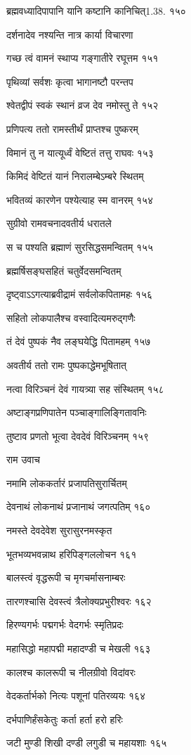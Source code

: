 ब्रह्मवध्यादिपापानि यानि कष्टानि कानिचित्1.38. १५०

दर्शनादेव नश्यन्ति नात्र कार्या विचारणा

गच्छ त्वं वामनं स्थाप्य गङ्गातीरे रघूत्तम १५१

पृथिव्यां सर्वशः कृत्वा भागानष्टौ परन्तप

श्वेतद्वीपं स्वकं स्थानं व्रज देव नमोस्तु ते १५२

प्रणिपत्य ततो रामस्तीर्थं प्राप्तश्च पुष्करम्

विमानं तु न यात्यूर्ध्वं वेष्टितं तत्तु राघवः १५३

किमिदं वेष्टितं यानं निरालम्बेऽम्बरे स्थितम्

भवितव्यं कारणेन पश्येत्याह स्म वानरम् १५४

सुग्रीवो रामवचनादवतीर्य धरातले

स च पश्यति ब्रह्माणं सुरसिद्धसमन्वितम् १५५

ब्रह्मर्षिसङ्घसहितं चतुर्वेदसमन्वितम्

दृष्ट्वाऽऽगत्याब्रवीद्रामं सर्वलोकपितामहः १५६

सहितो लोकपालैश्च वस्वादित्यमरुद्गणैः

तं देवं पुष्पकं नैव लङ्घयेद्धि पितामहम् १५७

अवतीर्य ततो रामः पुष्पकाद्धेमभूषितात्

नत्वा विरिञ्चनं देवं गायत्र्या सह संस्थितम् १५८

अष्टाङ्गप्रणिपातेन पञ्चाङ्गालिङ्गितावनिः

तुष्टाव प्रणतो भूत्वा देवदेवं विरिञ्चनम् १५९

राम उवाच

नमामि लोककर्तारं प्रजापतिसुरार्चितम्

देवनाथं लोकनाथं प्रजानाथं जगत्पतिम् १६०

नमस्ते देवदेवेश सुरासुरनमस्कृत

भूतभव्यभवन्नाथ हरिपिङ्गललोचन १६१

बालस्त्वं वृद्धरूपी च मृगचर्मासनाम्बरः

तारणश्चासि देवस्त्वं त्रैलोक्यप्रभुरीश्वरः १६२

हिरण्यगर्भः पद्मगर्भः वेदगर्भः स्मृतिप्रदः

महासिद्धो महापद्मी महादण्डी च मेखली १६३

कालश्च कालरूपी च नीलग्रीवो विदांवरः

वेदकर्तार्भको नित्यः पशूनां पतिरव्ययः १६४

दर्भपाणिर्हंसकेतुः कर्ता हर्ता हरो हरिः

जटी मुण्डी शिखी दण्डी लगुडी च महायशाः १६५

